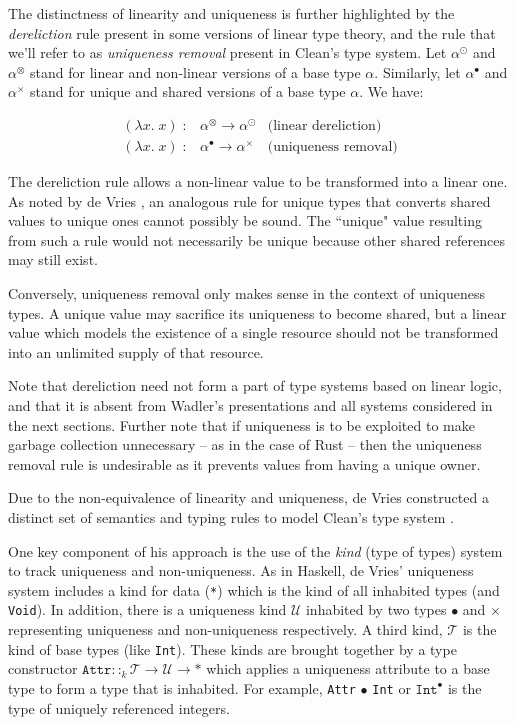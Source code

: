 \documentclass[]{unswthesis}
\let\c\texttt
\let\i\textit
\begin{document}
The distinctness of linearity and uniqueness is further highlighted by the \i{dereliction} rule present in some versions of linear type theory, and the rule that we'll refer to as \i{uniqueness removal} present in Clean's type system. Let $\alpha^\odot$ and $\alpha^\otimes$ stand for linear and non-linear versions of a base type $\alpha$. Similarly, let $\alpha^\bullet$ and $\alpha^\times$ stand for unique and shared versions of a base type $\alpha$. We have:

\begin{eqnarray*}
(\lambda x. \; x) \; : & \alpha^\otimes \rightarrow \alpha^\odot & \text{(linear dereliction)}\\
(\lambda x. \; x) \; : & \alpha^\bullet \rightarrow \alpha^\times & \text{(uniqueness removal)}
\end{eqnarray*}

The dereliction rule allows a non-linear value to be transformed into a linear one. As noted by de Vries \cite{deVriesPhD08}, an analogous rule for unique types that converts shared values to unique ones cannot possibly be sound. The ``unique" value resulting from such a rule would not necessarily be unique because other shared references may still exist.

Conversely, uniqueness removal only makes sense in the context of uniqueness types. A unique value may sacrifice its uniqueness to become shared, but a linear value which models the existence of a single resource should not be transformed into an unlimited supply of that resource.

Note that dereliction need not form a part of type systems based on linear logic, and that it is absent from Wadler's presentations \cite{wadler90, wadler93} and all systems considered in the next sections. Further note that if uniqueness is to be exploited to make garbage collection unnecessary -- as in the case of Rust -- then the uniqueness removal rule is undesirable as it prevents values from having a unique owner.

Due to the non-equivalence of linearity and uniqueness, de Vries constructed a distinct set of semantics and typing rules to model Clean's type system \cite{deVries07}.

One key component of his approach is the use of the \i{kind} (type of types) system to track uniqueness and non-uniqueness. As in Haskell, de Vries' uniqueness system includes a kind for data (\c{*}) which is the kind of all inhabited types (and \c{Void}). In addition, there is a uniqueness kind $\mathcal{U}$ inhabited by two types $\bullet$ and $\times$ representing uniqueness and non-uniqueness respectively. A third kind, $\mathcal{T}$ is the kind of base types (like \c{Int}). These kinds are brought together by a type constructor $\c{Attr} ::_k \mathcal{T} \rightarrow \mathcal{U} \rightarrow *$ which applies a uniqueness attribute to a base type to form a type that is inhabited. For example, \c{Attr} $\bullet$ \c{Int} or $\c{Int}^\bullet$ is the type of uniquely referenced integers.
\end{document}
